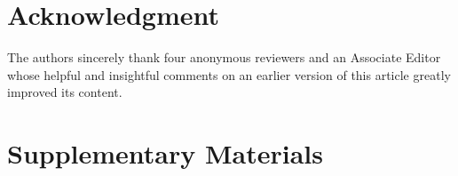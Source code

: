 \documentclass[journal,peerreview,nodraftcls]{IEEEtran}
\begin{document}












%
\section*{Acknowledgment}
The authors sincerely thank four anonymous reviewers and an Associate
Editor whose helpful and insightful comments on an earlier
version of this article greatly improved its content.


\renewcommand\thefigure{S\arabic{figure}}\setcounter{figure}{0}
\renewcommand\thetable{S\arabic{table}}\setcounter{table}{0}
\renewcommand\thesection{S\arabic{section}}\setcounter{section}{0}
\renewcommand\thesubsection{S\arabic{section}.\arabic{subsection}}
\renewcommand\theequation{E\arabic{equation}}
\newpage
\section*{Supplementary Materials}

\end{document}

